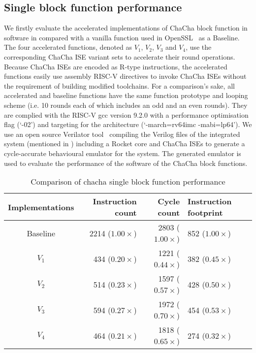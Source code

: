 
\subsection{Single block function performance}
\label{sec:eval:blk}
We firstly evaluate the accelerated implementations of ChaCha block function in software in compared with a vanilla function used in OpenSSL~\cite{OpenSSL} as a Baseline. The four accelerated functions, denoted as $V_1$, $V_2$, $V_3$ and $V_4$, use the corresponding ChaCha ISE variant sets to accelerate their round operations. 
Because ChaCha ISEs are encoded as R-type instructions, the accelerated functions easily use assembly RISC-V directives  to invoke ChaCha ISEs without the requirement of building modified toolchains.   
For a comparison's sake, all accelerated and baseline functions have the same function prototype and looping scheme (i.e. 10 rounds each of which includes an odd and an even rounds). 
They are complied with the RISC-V gcc version 9.2.0 with a performance optimisation flag (`-02') and targeting for the  architecture (`-march=rv64imc -mabi=lp64'). 
We use an open source Verilator tool~\cite{Verilator} compiling the Verilog files of the integrated system (mentioned in ) including a Rocket core and ChaCha ISEs to generate a cycle-accurate behavioural emulator for the system. The generated emulator is used to evaluate the performance of the software of the ChaCha block functions.  

\begin{table}
\caption{Comparison of chacha single block function performance}
\label{tab:res:sw:perf1}
\begin{tabular}{crrl}
\toprule            
Implementations        & Instruction count   & Cycle count & Instruction footprint\\

\midrule
Baseline     & 2214 ($1.00\times$)  & 2803 ($1.00\times$)    &  852 ($1.00\times$)  \\
 $V_1$ &  434 ($0.20\times$)     & 1221 ($0.44\times$) &  382 ($0.45\times$) \\
 $V_2$ &  514 ($0.23\times$)     & 1597 ($0.57\times$) &  428 ($0.50\times$)\\
 $V_3$ &  594 ($0.27\times$)     & 1972 ($0.70\times$) &  454 ($0.53\times$)\\
 $V_4$ &  464 ($0.21\times$)     & 1818 ($0.65\times$) &  274 ($0.32\times$)\\

\bottomrule
\end{tabular}
\end{table}

